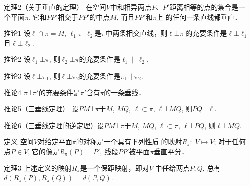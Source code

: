 \begin{blk}
    {定理2（关于垂直的定理）}
在空间$V$中和相异两点$P$、$P'$距离相等的点的集合是一
个平面$\pi$, 它和$PP'$相交于$PP'$的中点$M$, 而且$PP'$和$\pi$上
的任何一条直线都垂直．
\end{blk}

\begin{blk}
{推论1} 设$\ell\cap \pi=M$, $\ell_1$、$\ell_2$是$\pi$中两条相交直线，则$\ell\bot\pi$
的充要条件是$\ell\bot \ell_1$且$\ell\bot \ell_2$.
\end{blk}

\begin{blk}
{推论2}
设$\ell_1\bot\pi$, 则$\ell_2\bot\pi$的充要条件是$\ell_1\parallel \ell_2$.
\end{blk}

\begin{blk}
{推论3}
设$\ell\bot \pi_1$, 则$\ell\bot \pi_2$的充要条件是$\pi_1\parallel \pi_2$.
\end{blk}

\begin{blk}
{推论4}
$\pi\bot \pi'$的充要条件是$\pi'$含有$\pi$的一条垂线．

\end{blk}

\begin{blk}
    {推论5（三垂线定理）}
    设$PM\bot \pi$于$M$, $MQ$, $\ell\subset \pi$, 
$\ell\bot MQ$, 则$PQ\bot \ell$.
\end{blk}

\begin{blk}
{推论6（三垂线定理的逆定理）}设$PM\bot \pi$于$M$, $MQ$, 
$\ell\subset \pi$, $\ell\bot PQ$, 则$\ell\bot MQ$.
\end{blk}

\begin{blk}
    {定义} 空间$V$对给定平面$\pi$的对称是一个具有下列性质
的映射$R_{\pi}:\; V\mapsto V$; 对于任何点$P\in V$, 它的像是$R_{\pi}(P)=P'$, 
线段$PP'$被平面$\pi$垂直平分．
\end{blk}

\begin{blk}
    {定理3} 上述定义的映射$R_{\pi}$是一个保距映射，即对$V$
中任给两点$P,Q$, 总有$d(R_{\pi}(P),R_{\pi}(Q))=d(P,Q)$.
\end{blk}

